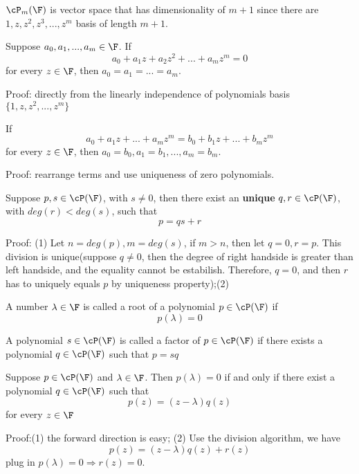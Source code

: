 \begin{refsection}
\begin{lemma}
$\cP_m(\F)$ is vector space that has dimensionality of $m+1$ since there are $1,z,z^2,z^3,...,z^m$ basis of length $m+1$.
\end{lemma}

\begin{theorem}
\cite[120]{axler2015linear}
Suppose $a_0,a_1,...,a_m \in \F$. If 
$$a_0 + a_1 z + a_2 z^2 + ... + a_m z^m = 0$$
for every $z\in \F$, then $a_0=a_1 = ... = a_m$.
\end{theorem}
Proof: directly from the linearly independence of polynomials basis $\{1,z,z^2,...,z^m\}$

\begin{theorem}[uniqueness]
If 
$$a_0 + a_1 z + ... + a_m z^m = b_0 + b_1 z + ... + b_m z^m$$
for every $z \in \F$, then $a_0=b_0,a_1=b_1,...,a_m = b_m$.
\end{theorem}
Proof: rearrange terms and use uniqueness of zero polynomials.


\begin{theorem}
Suppose $p,s\in \cP(\F)$, with $s\neq 0$, then there exist an \textbf{unique} $q,r \in \cP(\F)$, with $deg(r) < deg(s)$, such that 
$$p = qs + r$$
\end{theorem}
Proof: (1) Let $n=deg(p),m=deg(s)$, if $m > n$, then let $q=0, r = p$. This division is unique(suppose $q\neq 0$, then the degree of right handside is greater than left handside, and the equality cannot be estabilish. Therefore, $q=0$, and then $r$ has to uniquely equals $p$ by uniqueness property);(2)

\begin{definition}
A number $\lambda \in \F$ is called a root of a polynomial $p\in \cP(\F)$ if
$$p(\lambda) = 0$$
\end{definition}

\begin{definition}[factor]
A polynomial $s\in \cP(\F)$ is called a factor of $p\in \cP(\F)$ if there exists a polynomial $q\in \cP(\F)$ such that $p = sq$
\end{definition}

\begin{theorem}
\cite[122]{axler2015linear}Suppose $p\in \cP(\F)$ and $\lambda \in \F$. Then $p(\lambda) = 0$ if and only if there exist a polynomial $q\in \cP(\F)$ such that $$p(z) = (z-\lambda)q(z)$$
for every $z\in \F$
\end{theorem}
Proof:(1) the forward direction is easy; (2) Use the division algorithm, we have $$p(z)=(z-\lambda)q(z) + r(z)$$
plug in $p(\lambda) = 0 \Rightarrow r(z) = 0$.


\end{refsection}
